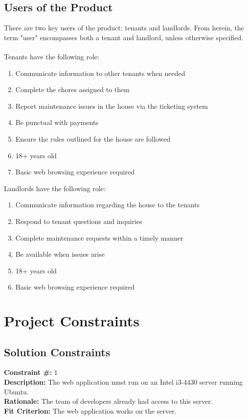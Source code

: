 \documentclass[12pt]{article}
\begin{document}
\subsection{Users of the Product}
There are two key users of the product: tenants and landlords. From herein, the term "user" encompasses both a tenant and landlord, unless otherwise specified. \\ \\
Tenants have the following role:
\begin{enumerate}
\item Communicate information to other tenants when needed
\item Complete the chores assigned to them
\item Report maintenance issues in the house via the ticketing system
\item Be punctual with payments
\item Ensure the rules outlined for the house are followed
\item 18+ years old
\item Basic web browsing experience required
\end{enumerate}
Landlords have the following role:
\begin{enumerate}
\item Communicate information regarding the house to the tenants
\item Respond to tenant questions and inquiries
\item Complete maintenance requests within a timely manner
\item Be available when issues arise
\item 18+ years old
\item Basic web browsing experience required
\end{enumerate}


\section{Project Constraints} 
	
\subsection{Solution Constraints}
\textbf{Constraint \#:} 1 \\
\textbf{Description: } The web application must run on an Intel i3-4430 server running Ubuntu. \\
\textbf{Rationale: } The team of developers already had access to this server. \\
\textbf{Fit Criterion: } The web application works on the server.
\end{document}
